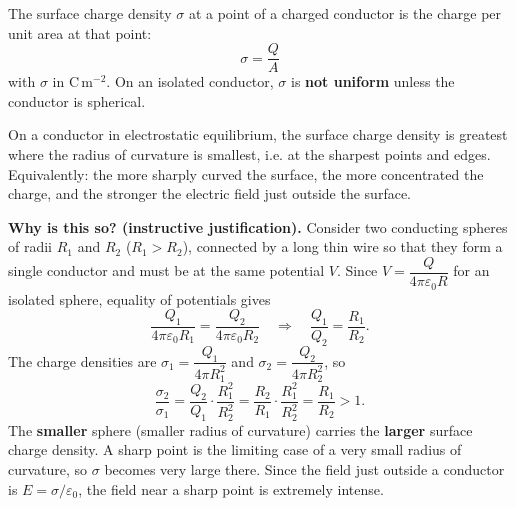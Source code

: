 \documentclass[11pt]{article}
\newcommand{\cle}[1]{{\popxbold\color{popdark}#1}}
\begin{document}
\begin{definition}
The \cle{surface charge density} $\sigma$ at a point of a charged conductor is the charge per unit area at that point:
\[
\sigma = \frac{Q}{A}
\]
with $\sigma$ in $\mathrm{C\,m^{-2}}$. On an isolated conductor, $\sigma$ is \textbf{not uniform} unless the conductor is spherical.
\end{definition}

\begin{propriete}
On a conductor in electrostatic equilibrium, the surface charge density is \cle{greatest where the radius of curvature is smallest}, i.e. at the sharpest points and edges. Equivalently: the more sharply curved the surface, the more concentrated the charge, and the stronger the electric field just outside the surface.
\end{propriete}

\textbf{Why is this so? (instructive justification).} Consider two conducting spheres of radii $R_1$ and $R_2$ ($R_1 > R_2$), connected by a long thin wire so that they form a single conductor and must be at the same potential $V$. Since $V = \dfrac{Q}{4\pi\varepsilon_0 R}$ for an isolated sphere, equality of potentials gives
\[
\frac{Q_1}{4\pi\varepsilon_0 R_1} = \frac{Q_2}{4\pi\varepsilon_0 R_2}
\quad\Longrightarrow\quad
\frac{Q_1}{Q_2} = \frac{R_1}{R_2}.
\]
The charge densities are $\sigma_1 = \dfrac{Q_1}{4\pi R_1^2}$ and $\sigma_2 = \dfrac{Q_2}{4\pi R_2^2}$, so
\[
\frac{\sigma_2}{\sigma_1} = \frac{Q_2}{Q_1}\cdot\frac{R_1^2}{R_2^2} = \frac{R_2}{R_1}\cdot\frac{R_1^2}{R_2^2} = \frac{R_1}{R_2} > 1.
\]
The \textbf{smaller} sphere (smaller radius of curvature) carries the \textbf{larger} surface charge density. A sharp point is the limiting case of a very small radius of curvature, so $\sigma$ becomes very large there. Since the field just outside a conductor is $E = \sigma/\varepsilon_0$, the field near a sharp point is extremely intense.
\end{document}
